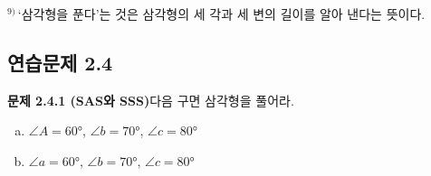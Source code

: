 \documentclass{article}
\begin{document}
\noindent$^{9)}$\,\small`삼각형을 푼다'는 것은 삼각형의 세 각과 세 변의 길이를 알아 낸다는 뜻이다.\normalsize

\subsection*{연습문제 2.4}

\textbf{문제 2.4.1 (SAS와 SSS)}\quad 다음 구면 삼각형을 풀어라.
\begin{enumerate}[(a)]
  \item $\angle A = 60°$,\; $\angle b = 70°$,\; $\angle c = 80°$
  \item $\angle a = 60°$,\; $\angle b = 70°$,\; $\angle c = 80°$
\end{enumerate}
\end{document}

